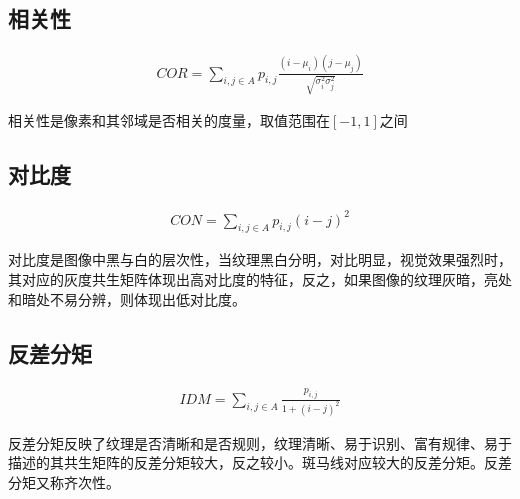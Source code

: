\subsection{相关性}
\begin{align}
COR=\sum_{i, j\in A} p_{i,j} \frac{(i-\mu_i)(j-\mu_j)}{\sqrt{\sigma_i^2\sigma_j^2}}
\end{align}\par
相关性是像素和其邻域是否相关的度量，取值范围在$[-1, 1]$之间
\subsection{对比度}
\begin{align}
CON=\sum_{i, j\in A} p_{i,j}(i-j)^2
\end{align}\par
对比度是图像中黑与白的层次性，当纹理黑白分明，对比明显，视觉效果强烈时，其对应的灰度共生矩阵体现出高对比度的特征，反之，如果图像的纹理灰暗，亮处和暗处不易分辨，则体现出低对比度。
\subsection{反差分矩}
\begin{align}
IDM=\sum_{i, j\in A} \frac{p_{i,j}}{1+(i-j)^2}
\end{align}\par
反差分矩反映了纹理是否清晰和是否规则，纹理清晰、易于识别、富有规律、易于描述的其共生矩阵的反差分矩较大，反之较小。斑马线对应较大的反差分矩。反差分矩又称齐次性。